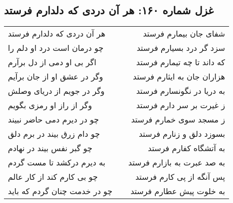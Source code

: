 \begin{center}
\section*{غزل شماره ۱۶۰: هر آن دردی که دلدارم فرستد}
\label{sec:160}
\begin{longtable}{l p{0.5cm} r}
هر آن دردی که دلدارم فرستد
&&
شفای جان بیمارم فرستد
\\
چو درمان است درد او دلم را
&&
سزد گر درد بسیارم فرستد
\\
اگر بی او دمی از دل برآرم
&&
که داند تا چه تیمارم فرستد
\\
وگر در عشق او از جان برآیم
&&
هزاران جان به ایثارم فرستد
\\
وگر در جویم از دریای وصلش
&&
به دریا در نگونسارم فرستد
\\
وگر از راز او رمزی بگویم
&&
ز غیرت بر سر دارم فرستد
\\
چو در دیرم دمی حاضر نبیند
&&
ز مسجد سوی خمارم فرستد
\\
چو دام زرق بیند در برم دلق
&&
بسوزد دلق و زنارم فرستد
\\
چو گبر نفس بیند در نهادم
&&
به آتشگاه کفارم فرستد
\\
به دیرم درکشد تا مست گردم
&&
به صد عبرت به بازارم فرستد
\\
چو بی کارم کند از کار عالم
&&
پس آنگه از پی کارم فرستد
\\
چو در خدمت چنان گردم که باید
&&
به خلوت پیش عطارم فرستد
\\
\end{longtable}
\end{center}
